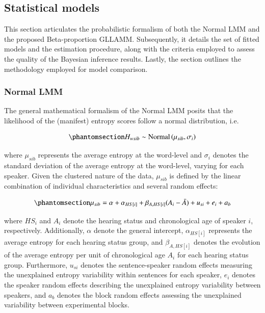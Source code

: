 \documentclass[
  authoryear,
  preprint,
  1p]{elsarticle}
\begin{document}
\subsection{Statistical models}\label{sec-M-SM}

This section articulates the probabilistic formalism of both the Normal
LMM and the proposed Beta-proportion GLLAMM. Subsequently, it details
the set of fitted models and the estimation procedure, along with the
criteria employed to assess the quality of the Bayesian inference
results. Lastly, the section outlines the methodology employed for model
comparison.

\subsubsection{Normal LMM}\label{sec-M-SM-NLMM}

The general mathematical formalism of the Normal LMM posits that the
likelihood of the (manifest) entropy scores follow a normal
distribution, i.e.

\begin{equation}\phantomsection\label{eq-normal-LMM-likelihood}{
H_{wsib} \sim \text{Normal} \left( \mu_{sib}, \sigma_{i} \right)
}\end{equation}

where \(\mu_{sib}\) represents the average entropy at the word-level and
\(\sigma_{i}\) denotes the standard deviation of the average entropy at
the word-level, varying for each speaker. Given the clustered nature of
the data, \(\mu_{sib}\) is defined by the linear combination of
individual characteristics and several random effects:

\begin{equation}\phantomsection\label{eq-normal-LMM-linearpred}{
\mu_{sib} = \alpha + \alpha_{HS[i]} + \beta_{A, HS[i]} (A_{i} - \bar{A}) + u_{si} + e_{i} + a_{b}
}\end{equation}

where \(HS_{i}\) and \(A_{i}\) denote the hearing status and
chronological age of speaker \(i\), respectively. Additionally,
\(\alpha\) denote the general intercept, \(\alpha_{HS[i]}\) represents
the average entropy for each hearing status group, and
\(\beta_{A,HS[i]}\) denotes the evolution of the average entropy per
unit of chronological age \(A_{i}\) for each hearing status group.
Furthermore, \(u_{si}\) denotes the sentence-speaker random effects
measuring the unexplained entropy variability within sentences for each
speaker, \(e_{i}\) denotes the speaker random effects describing the
unexplained entropy variability between speakers, and \(a_{b}\) denotes
the block random effects assessing the unexplained variability between
experimental blocks.
\end{document}
